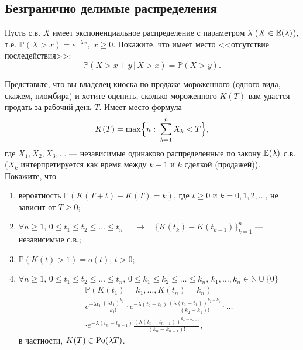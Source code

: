 \subsection{ Безгранично делимые распределения }

\begin{problem}
Пусть с.в. $X$ имеет экспоненциальное распределение с параметром $\lambda$ ($X\in\mathrm{{\mathbb E}}(\lambda)$), т.е. 
${\mathbb P}(X>x)=e^{-\lambda x},\; x\geqslant 0$. Покажите, что имеет место <<отсутствие последействия>>: 
$$
{\mathbb P}(X>x+y\,|\, X>x)={\mathbb P}(X>y) . 
$$
\end{problem}


\begin{problem}
Представьте, что вы владелец киоска по продаже мороженного (одного вида, скажем, пломбира) и хотите оценить, сколько мороженного $K(T)$ 
вам удастся продать за рабочий день $T$. Имеет место формула 
$$
K(T)=\max\Bigl\{ n:\; \sum\limits_{k=1}^{n} X_k<T \Bigr\} , 
$$
где $X_1, X_2, X_3,\ldots$ --- независимые одинаково распределенные по закону $\mathrm{{\mathbb E}}(\lambda)$ с.в. ($X_k$ интерпретируется как время между 
$k-1$ и $k$ сделкой (продажей)). Покажите, что 
\begin{enumerate}
\item вероятность ${\mathbb P}(K(T+t)-K(T)=k)$, где $t\geqslant 0$ и $k=0,1,2,\ldots$, не зависит от $T\geqslant 0$; 

\item $\forall n\geqslant 1$, $0\leqslant t_1\leqslant t_2\leqslant \ldots\leqslant t_n$ 
$\quad\to\quad \bigl\{ K(t_k)-K(t_{k-1})\bigr\}_{k=1}^{n}$ --- независимые с.в.; 

\item ${\mathbb P}(K(t)>1)=o(t)$, $t>0$; 

\item $\forall n\geqslant 1$, $0\leqslant t_1\leqslant t_2\leqslant \ldots\leqslant t_n$, 
$0\leqslant k_1\leqslant k_2\leqslant \ldots\leqslant k_n$, $k_1,\ldots, k_n\in {\mathbb N}\cup \{ 0\}$ 
\begin{multline*}
{\mathbb P}(K(t_1) = k_1,\ldots, K(t_n)=k_n)= \\
e^{-\lambda t_1} \frac{(\lambda t_1)^{k_1}}{k_1!}\cdot 
e^{-\lambda(t_2-t_1)} \frac{(\lambda(t_2-t_1))^{k_2-k_1}}{(k_2-k_1)!}\cdot \ldots \\
\cdot e^{-\lambda(t_n-t_{n-1})}\frac{(\lambda(t_n-t_{n-1}))^{k_n-k_{n-1}}}{(k_n-k_{n-1})!} , 
\end{multline*}
в частности, $K(T)\in \mathrm{Po}(\lambda T)$. 
\end{enumerate}
\end{problem}



